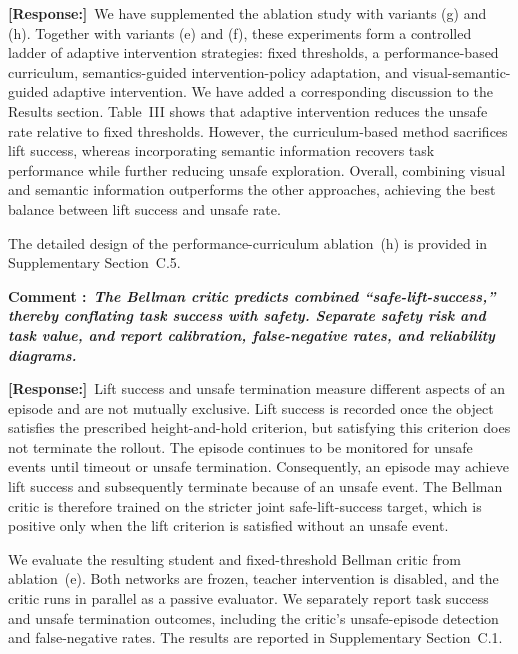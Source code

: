 \documentclass[12pt]{article}
\newcommand{\response}{\par\smallskip\noindent\textbf{[Response:]}\ }
\newcommand{\responsetableinput}[1]{%
  \begingroup
  \let\small\footnotesize
  \let\normalsize\footnotesize
  \endgroup
}
\newcommand{\responseablationinput}[1]{%
  \begingroup
  \let\responseoriginalresizebox\resizebox
  \renewcommand{\resizebox}[3]{%
    \responseoriginalresizebox{0.70\textwidth}{##2}{##3}}%
  \responsetableinput{#1}%
  \endgroup
}
\newcounter{reviewcomment}
\newcounter{reviewer}
\newcommand{\reviewcomment}[1]{%
  \refstepcounter{reviewcomment}
  \par\smallskip\noindent\textbf{Comment \thereviewcomment:}\
  \textbf{\itshape #1}\par
}
\begin{document}
\response We have supplemented the ablation study with variants (g) and (h).
Together with variants (e) and (f), these experiments form a controlled ladder
of adaptive intervention strategies: fixed thresholds, a performance-based
curriculum, semantics-guided intervention-policy adaptation, and
visual-semantic-guided adaptive intervention. We have added a corresponding
discussion to the Results section. Table~III shows that adaptive intervention
reduces the unsafe rate relative to fixed thresholds. However, the
curriculum-based method sacrifices lift success, whereas incorporating semantic
information recovers task performance while further reducing unsafe
exploration. Overall, combining visual and semantic information outperforms the
other approaches, achieving the best balance between lift success and unsafe
rate.

The detailed design of the performance-curriculum ablation~(h) is provided in
Supplementary Section~C.5.

\begingroup
\let\responsetable\table
\let\endresponsetable\endtable
\renewenvironment{table}[1][]{\responsetable[H]}{\endresponsetable}
\let\responsecommenttwolabel\label
\renewcommand{\label}[1]{\responsecommenttwolabel{tab:reviewer22-comment2-ablation}}
\responseablationinput{../../../table/ablation_studies.tex}
\endgroup

\reviewcomment{The Bellman critic predicts combined ``safe-lift-success,''
thereby conflating task success with safety. Separate safety risk and task value,
and report calibration, false-negative rates, and reliability diagrams.}

\response Lift success and unsafe termination measure different aspects of an
episode and are not mutually exclusive. Lift success is recorded once the
object satisfies the prescribed height-and-hold criterion, but satisfying this
criterion does not terminate the rollout. The episode continues to be monitored
for unsafe events until timeout or unsafe termination. Consequently, an episode
may achieve lift success and subsequently terminate because of an unsafe event.
The Bellman critic is therefore trained on the stricter joint safe-lift-success
target, which is positive only when the lift criterion is satisfied without an
unsafe event.

We evaluate the resulting student and fixed-threshold Bellman critic from
ablation~(e). Both networks are frozen, teacher intervention is disabled, and
the critic runs in parallel as a passive evaluator. We separately report task
success and unsafe termination outcomes, including the critic's unsafe-episode
detection and false-negative rates. The results are reported in Supplementary Section~C.1.
\end{document}
